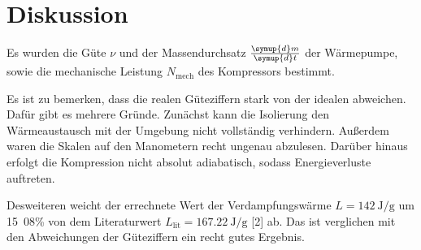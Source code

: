 \section{Diskussion}
\label{sec:Diskussion}

Es wurden die Güte $\nu$ und der Massendurchsatz 
$\frac{\symup{d}m}{\symup{d}t}$ der Wärmepumpe, sowie die 
mechanische Leistung $N_\text{mech}$ des Kompressors bestimmt. 

Es ist zu bemerken, dass die realen Güteziffern stark 
von der idealen abweichen. Dafür gibt es mehrere Gründe. 
Zunächst kann die Isolierung den Wärmeaustausch mit der 
Umgebung nicht vollständig verhindern. Außerdem waren
die Skalen auf den Manometern recht ungenau abzulesen. 
Darüber hinaus erfolgt die Kompression nicht absolut 
adiabatisch, sodass Energieverluste auftreten. 

Desweiteren weicht der errechnete Wert der Verdampfungswärme
$L = \SI{142}{\joule\per\gram}$ um \si{15.08}\% von dem Literaturwert 
$L_\text{lit}=\SI{167.22}{\joule\per\gram}$ [2] ab. Das ist 
verglichen mit den Abweichungen der Güteziffern ein recht gutes 
Ergebnis.